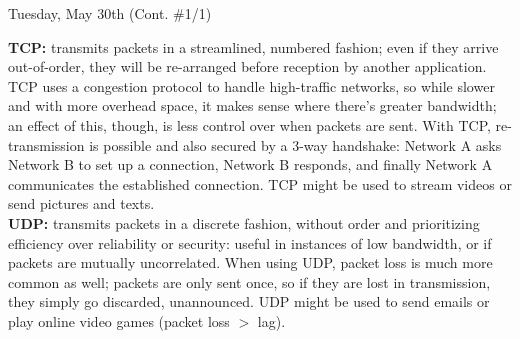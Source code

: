\documentclass[11pt]{article}
\begin{document}
\begin{bloodorangebox}{Tuesday, May 30th (Cont. \#1/1)\vspace{-2.2em}\begin{flushright}\large{}\end{flushright}}
\begin{multicols}{2}
        \scriptsize\textbf{TCP:} transmits packets in a streamlined, numbered fashion; even if they arrive out-of-order, they will be re-arranged before reception by another application. TCP uses a congestion protocol to handle high-traffic networks, so while slower and with more overhead space, it makes sense where there's greater bandwidth; an effect of this, though, is less control over when packets are sent. With TCP, re-transmission is possible and also secured by a 3-way handshake: Network A asks Network B to set up a connection, Network B responds, and finally Network A communicates the established connection. TCP might be used to stream videos or send pictures and texts. \\
        \hline
        \vspace{0.75em}
        \scriptsize\textbf{UDP:} transmits packets in a discrete fashion, without order and prioritizing efficiency over reliability or security: useful in instances of low bandwidth, or if packets are mutually uncorrelated. When using UDP, packet loss is much more common as well; packets are only sent once, so if they are lost in transmission, they simply go discarded, unannounced. UDP might be used to send emails or play online video games (packet loss $>$ lag).
    \end{multicols}
\end{bloodorangebox}

\begin{center}
\hspace{0.2cm}
\vspace{-0.5em}
\end{center}
\end{document}
